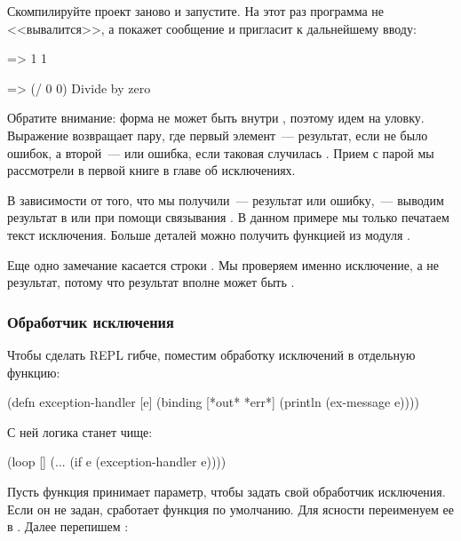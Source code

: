 Скомпилируйте проект заново и запустите. На этот раз программа не <<вывалится>>, а покажет сообщение и пригласит к дальнейшему вводу:

\begin{english}
  \begin{clojure}
=> 1
1

=> (/ 0 0)
Divide by zero
  \end{clojure}
\end{english}

Обратите внимание: форма  не может быть внутри , поэтому идем на уловку. Выражение  возвращает пару, где первый элемент~--- результат, если не было ошибок, а второй~---  или ошибка, если таковая случилась . Прием с парой мы рассмотрели в первой книге в главе об исключениях.

В зависимости от того, что мы получили~--- результат или ошибку,~--- выводим результат в  или  при помощи связывания . В данном примере мы только печатаем текст исключения. Больше деталей можно получить функцией  из модуля .

Еще одно замечание касается строки  . Мы проверяем именно исключение, а не результат, потому что результат вполне может быть .

\subsubsection{Обработчик исключения}

Чтобы сделать REPL гибче, поместим обработку исключений в отдельную функцию:

\begin{english}
  \begin{clojure}
(defn exception-handler [e]
  (binding [*out* *err*]
    (println (ex-message e))))
  \end{clojure}
\end{english}

С ней логика  станет чище:

\begin{english}
  \begin{clojure}
(loop []
  (...
   (if e
     (exception-handler e))))
  \end{clojure}
\end{english}

Пусть функция  принимает параметр, чтобы задать свой обработчик исключения. Если он не задан, сработает функция по умолчанию. Для ясности переименуем ее в . Далее перепишем :

